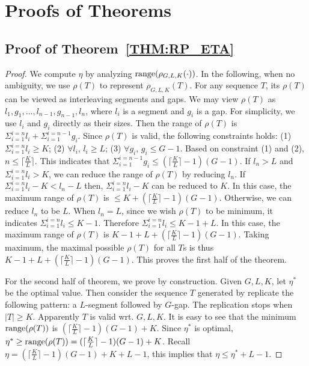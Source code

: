 \appendix
\section{Proofs of Theorems}
\subsection{Proof of Theorem~\ref{THM:RP_ETA}} 
\label{appx:proof-rp-eta}
\begin{proof}
We compute $\eta$ by analyzing $\operatorname*{range}(\rho_{G,L,K}(\cdot))$.
In the following, when no ambiguity, we use $\rho(T)$ to represent
$\rho_{G,L,K}(T)$. For any sequence $T$, its $\rho(T)$ can
be viewed as interleaving segments and gaps. 
We may view $\rho(T)$ as $l_1,g_1,\ldots, l_{n-1}, g_{n-1}, l_n$, where $l_i$ is a
segment and $g_i$ is a gap. For simplicity, we use $l_i$ and $g_i$ directly as their sizes.
Then the
range of $\rho(T)$ is $\Sigma_{i=1}^{i=n} l_i + \Sigma_{i=1}^{i=n-1} g_i$. 
Since $\rho(T)$ is valid, the following constraints holds: 
(1) $\Sigma_{i=1}^{i=n} l_i \geq K$; (2) $\forall l_i$, $l_i \geq L$;
(3) $\forall g_i$, $g_i \leq G-1$. Based on constraint (1) and (2), 
$n \leq \lceil \frac{K}{L}\rceil$. 
This indicates that $\Sigma_{i=1}^{i=n-1} g_i \leq (\lceil \frac{K}{L}\rceil -1 ) (G-1)$.
If $l_n > L$ and $\Sigma_{i=1}^{i=n} l_i > K$, we can reduce the range of $\rho(T)$
by reducing $l_n$. If $\Sigma_{i=1}^{i=n} l_i - K < l_n - L$ 
then, $\Sigma_{i=1}^{i=n} l_i - K$ can be reduced to $K$. In this case, the maximum range of $\rho(T)$ is 
$\leq K +(\lceil \frac{K}{L}\rceil -1 ) (G-1)$.
Otherwise, we can reduce $l_n$ to be $L$. When $l_n = L$, 
since we wish $\rho(T)$ to be minimum, it indicates $\Sigma_{i=1}^{i=n} l_i \leq K-1$.
Therefore $\Sigma_{i=1}^{i=n} l_i \leq K-1+L$. In this case,
the maximum range of  $\rho(T)$ is $K-1+L +(\lceil \frac{K}{L}\rceil -1 ) (G-1)$.
Taking maximum, the maximal possible $\rho(T)$ for all $T$s is thus $K-1+L +(\lceil \frac{K}{L}\rceil -1 ) (G-1)$. This proves the first half of the theorem.

For the second half of theorem, we prove by construction. Given $G,L,K$, let $\eta^*$
be the optimal value. Then consider the sequence $T$ generated 
by replicate the following pattern: a $L$-segment followed by $G$-gap. The replication
stops when $|T|\geq K$. Apparently $T$ is valid wrt. $G,L,K$.
It is easy to see that the minimum $\operatorname*{range}(\rho(T))$ 
is $(\lceil \frac{K}{L}\rceil -1 ) (G-1) + K$. Since $\eta^*$ is optimal,
$\eta^* \geq \operatorname*{range}(\rho(T)) = (\lceil \frac{K}{L}\rceil -1 ) (G-1) + K$. Recall $\eta =(\lceil \frac{K}{L}\rceil -1 ) (G-1) + K +L-1$, this implies that $\eta \leq \eta^* + L - 1$. 
\end{proof}
